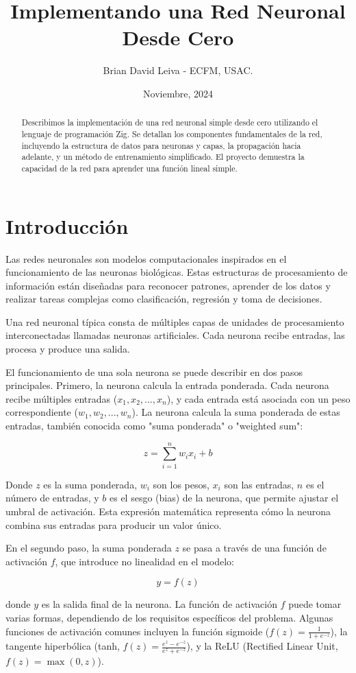 \documentclass[twocolumn]{article}
\title{Implementando una Red Neuronal Desde Cero}
\author{Brian David Leiva - ECFM, USAC.}
\date{Noviembre, 2024}
\begin{document}
\maketitle

\begin{abstract}
Describimos la implementación de una red neuronal simple desde cero utilizando el lenguaje de programación Zig. Se detallan los componentes fundamentales de la red, incluyendo la estructura de datos para neuronas y capas, la propagación hacia adelante, y un método de entrenamiento simplificado. El proyecto demuestra la capacidad de la red para aprender una función lineal simple.
\end{abstract}

\section{Introducción}
Las redes neuronales son modelos computacionales inspirados en el funcionamiento de las neuronas biológicas. Estas estructuras de procesamiento de información están diseñadas para reconocer patrones, aprender de los datos y realizar tareas complejas como clasificación, regresión y toma de decisiones.

Una red neuronal típica consta de múltiples capas de unidades de procesamiento interconectadas llamadas neuronas artificiales. Cada neurona recibe entradas, las procesa y produce una salida.

El funcionamiento de una sola neurona se puede describir en dos pasos principales. Primero, la neurona calcula la entrada ponderada. Cada neurona recibe múltiples entradas ($x_1, x_2, ..., x_n$), y cada entrada está asociada con un peso correspondiente ($w_1, w_2, ..., w_n$). La neurona calcula la suma ponderada de estas entradas, también conocida como "suma ponderada" o "weighted sum":

\[
z = \sum_{i=1}^n w_i x_i + b
\]

Donde $z$ es la suma ponderada, $w_i$ son los pesos, $x_i$ son las entradas, $n$ es el número de entradas, y $b$ es el sesgo (bias) de la neurona, que permite ajustar el umbral de activación. Esta expresión matemática representa cómo la neurona combina sus entradas para producir un valor único.

En el segundo paso, la suma ponderada $z$ se pasa a través de una función de activación $f$, que introduce no linealidad en el modelo: 

\[y = f(z)\]

donde $y$ es la salida final de la neurona. La función de activación $f$ puede tomar varias formas, dependiendo de los requisitos específicos del problema. Algunas funciones de activación comunes incluyen la función sigmoide ($f(z) = \frac{1}{1 + e^{-z}}$), la tangente hiperbólica (tanh, $f(z) = \frac{e^z - e^{-z}}{e^z + e^{-z}}$), y la ReLU (Rectified Linear Unit, $f(z) = \max(0, z)$).
\end{document}

